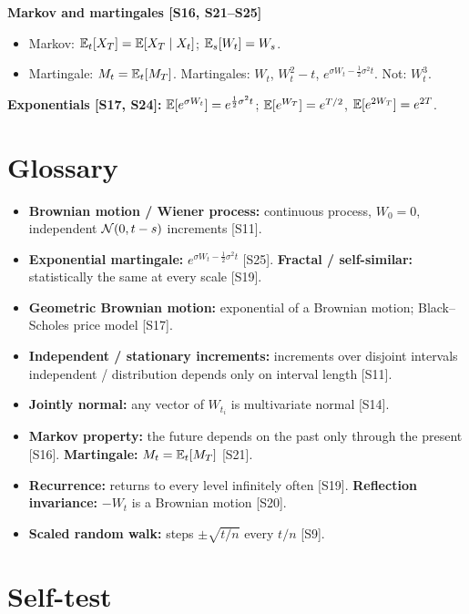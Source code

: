 \documentclass[10pt]{article}
\begin{document}
\textbf{Markov and martingales [S16, S21--S25]}
\begin{itemize}
\item Markov: $\mathbb{E}_t[X_T]=\mathbb{E}[X_T\mid X_t]$; $\mathbb{E}_s[W_t]=W_s$.
\item Martingale: $M_t=\mathbb{E}_t[M_T]$. Martingales: $W_t$, $W_t^2-t$, $e^{\sigma W_t-\frac12\sigma^2t}$. Not: $W_t^3$.
\end{itemize}
\textbf{Exponentials [S17, S24]:} $\mathbb{E}[e^{\sigma W_t}]=e^{\frac12\sigma^2t}$; $\mathbb{E}[e^{W_T}]=e^{T/2}$, $\mathbb{E}[e^{2W_T}]=e^{2T}$.

\section{Glossary}
\begin{itemize}
\item \textbf{Brownian motion / Wiener process:} continuous process, $W_0=0$, independent $\mathcal{N}(0,t-s)$ increments [S11].
\item \textbf{Exponential martingale:} $e^{\sigma W_t-\frac12\sigma^2t}$ [S25]. \quad \textbf{Fractal / self-similar:} statistically the same at every scale [S19].
\item \textbf{Geometric Brownian motion:} exponential of a Brownian motion; Black--Scholes price model [S17].
\item \textbf{Independent / stationary increments:} increments over disjoint intervals independent / distribution depends only on interval length [S11].
\item \textbf{Jointly normal:} any vector of $W_{t_i}$ is multivariate normal [S14].
\item \textbf{Markov property:} the future depends on the past only through the present [S16]. \quad \textbf{Martingale:} $M_t=\mathbb{E}_t[M_T]$ [S21].
\item \textbf{Recurrence:} returns to every level infinitely often [S19]. \quad \textbf{Reflection invariance:} $-W_t$ is a Brownian motion [S20].
\item \textbf{Scaled random walk:} steps $\pm\sqrt{t/n}$ every $t/n$ [S9].
\end{itemize}

\section{Self-test}
\end{document}

